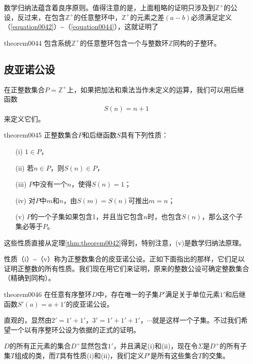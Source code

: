 数学归纳法蕴含着良序原则。值得注意的是，上面粗略的证明只涉及到$\mathbb{Z}^+$的公设，反过来，在包含$\mathbb{Z}^+$的任意整环中，$\mathbb{Z}^+$的元素之差$(a-b)$必须满足定义（\ref{equation0042}）\textasciitilde（\ref{equation0044}），这就证明了
\begin{theorem}{}{theorem0044}
包含系统$\mathbb{Z}^+$的任意整环包含一个与整数环$\mathbb{Z}$同构的子整环。
\end{theorem}

\subsection{皮亚诺公设}
在正整数集合$P=\mathbb{Z}^+$上，如果把加法和乘法当作未定义的运算，我们可以用后继函数
\begin{gather}\label{equation0045}
S(n)=n+1
\end{gather}
来定义它们。

\begin{theorem}{}{theorem0045}
正整数集合$P$和后继函数$S$具有下列性质：
\begin{enumerate}
\item[(i)] $1 \in P$，
\item[(ii)] 若$n \in P$，则$S(n) \in P$，
\item[(iii)] $P$中没有一个$n$，使得$S(n)=1$；
\item[(iv)] 对$P$中$m$和$n$，由$S(m)=S(n)$可推出$m=n$；
\item[(v)] $P$的一个子集如果包含1，并且当它包含$n$时，也包含$S(n)$，那么这个子集必等于$P$。
\end{enumerate}
\end{theorem}

这些性质直接从定理\ref{thm:theorem0042}得到，特别注意，(v)是数学归纳法原理。

性质（i）\textasciitilde（v）称为正整数集合的皮亚诺公设。正如下面指出的那样，它们足以证明正整数的所有性质。我们现在用它们来证明，原来的整数公设可确定整数集合（精确到同构）。

\begin{theorem}{}{theorem0046}
在任意有序整环$D$中，存在唯一的子集$P'$满足关于单位元素$1'$和后继函数$S'(a)=a+1'$的皮亚诺公设。
\end{theorem}

直观的，显然由$2'=1'+1'$，$3'=1'+1'+1'$，$\cdots$就是这样一个子集。不过我们希望一个以有序整环公设为依据的正式的证明。

$D$的所有正元素的集合$D^+$显然包含$1'$，并且满足(i)和(ii)，现在令$\Sigma$是$D^+$的所有子集$T$组成的类，而$T$具有性质(i)和(ii)，我们定义$P'$是所有这些集合$T$的交集。

